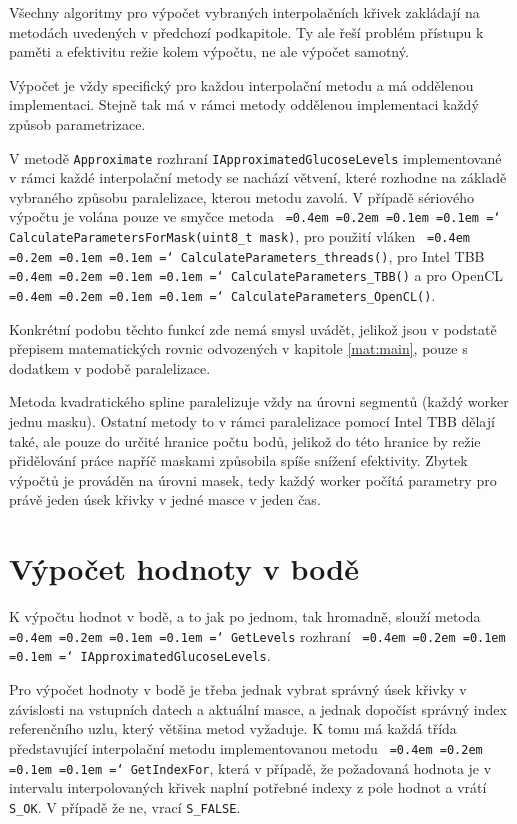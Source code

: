 \documentclass[]{thesiskiv}
\newcommand*\justify{
  \fontdimen2\font=0.4em
  \fontdimen3\font=0.2em
  \fontdimen4\font=0.1em
  \fontdimen7\font=0.1em
  \hyphenchar\font=`\-
}
\begin{document}
Všechny algoritmy pro výpočet vybraných interpolačních křivek zakládají na metodách uvedených v předchozí podkapitole. Ty ale řeší problém přístupu k paměti a efektivitu režie kolem výpočtu, ne ale výpočet samotný.

Výpočet je vždy specifický pro každou interpolační metodu a má oddělenou implementaci. Stejně tak má v rámci metody oddělenou implementaci každý způsob parametrizace.

V metodě \texttt{Approximate} rozhraní \texttt{IApproximatedGlucoseLevels} implementované v rámci každé interpolační metody se nachází větvení, které rozhodne na základě vybraného způsobu paralelizace, kterou metodu zavolá. V případě sériového výpočtu je volána pouze ve smyčce metoda \texttt{\justify CalculateParametersForMask(uint8\_t mask)}, pro použití vláken \texttt{\justify CalculateParameters\_threads()}, pro Intel TBB \texttt{\justify CalculateParameters\_TBB()} a pro OpenCL \texttt{\justify CalculateParameters\_OpenCL()}.

Konkrétní podobu těchto funkcí zde nemá smysl uvádět, jelikož jsou v podstatě přepisem matematických rovnic odvozených v kapitole \ref{mat:main}, pouze s dodatkem v podobě paralelizace.

Metoda kvadratického spline paralelizuje vždy na úrovni segmentů (každý worker jednu masku). Ostatní metody to v rámci paralelizace pomocí Intel TBB dělají také, ale pouze do určité hranice počtu bodů, jelikož do této hranice by režie přidělování práce napříč maskami způsobila spíše snížení efektivity. Zbytek výpočtů je prováděn na úrovni masek, tedy každý worker počítá parametry pro právě jeden úsek křivky v jedné masce v jeden čas.

\section{Výpočet hodnoty v bodě}

K výpočtu hodnot v bodě, a to jak po jednom, tak hromadně, slouží metoda \texttt{\justify GetLevels} rozhraní \texttt{\justify IApproximatedGlucoseLevels}.

Pro výpočet hodnoty v bodě je třeba jednak vybrat správný úsek křivky v závislosti na vstupních datech a aktuální masce, a jednak dopočíst správný index referenčního uzlu, který většina metod vyžaduje. K tomu má každá třída představující interpolační metodu implementovanou metodu \texttt{\justify GetIndexFor}, která v případě, že požadovaná hodnota je v intervalu interpolovaných křivek naplní potřebné indexy z pole hodnot a vrátí \texttt{S\_OK}. V případě že ne, vrací \texttt{S\_FALSE}.
\end{document}
